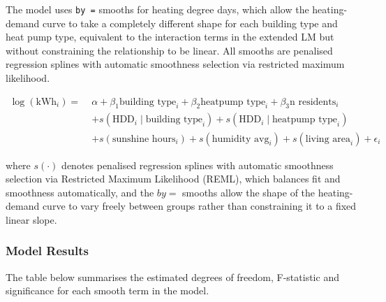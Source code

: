 \documentclass[
]{article}
\begin{document}
The model uses \texttt{by\ =} smooths for heating degree days, which
allow the heating- demand curve to take a completely different shape for
each building type and heat pump type, equivalent to the interaction
terms in the extended LM but without constraining the relationship to be
linear. All smooths are penalised regression splines with automatic
smoothness selection via restricted maximum likelihood.

\begin{align}
\log(\text{kWh}_i) = \; & \alpha + \beta_1 \text{building type}_i + \beta_2 \text{heatpump type}_i + \beta_3 \text{n residents}_i \\
& + s(\text{HDD}_i \mid \text{building type}_i) + s(\text{HDD}_i \mid \text{heatpump type}_i) \\
& + s(\text{sunshine hours}_i) + s(\text{humidity avg}_i) + s(\text{living area}_i) + \epsilon_i
\end{align}

where \(s(\cdot)\) denotes penalised regression splines with automatic
smoothness selection via Restricted Maximum Likelihood (REML), which
balances fit and smoothness automatically, and the \(by =\) smooths
allow the shape of the heating-demand curve to vary freely between
groups rather than constraining it to a fixed linear slope.

\subsubsection{Model Results}\label{model-results-3}

The table below summarises the estimated degrees of freedom, F-statistic
and significance for each smooth term in the model.
\end{document}
